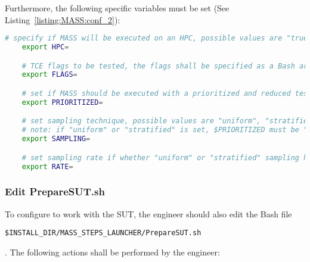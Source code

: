 Furthermore, the following specific \MASS variables must be set (See Listing~\ref{listing:MASS:conf_2}):

\begin{lstlisting}[language=bash, label=listing:MASS:conf_2, caption=\MASS specific variables. Excerpt of mass\_conf.sh file.]
	# specify if MASS will be executed on an HPC, possible values are "true" or "false"
	export HPC=

	# TCE flags to be tested, the flags shall be specified as a Bash array, e.g., ("-O0" "-O1").
	export FLAGS=

	# set if MASS should be executed with a prioritized and reduced test suite, possible values are "true" or "false"
	export PRIORITIZED=

	# set sampling technique, possible values are "uniform", "stratified", "fsci", and "no"
	# note: if "uniform" or "stratified" is set, $PRIORITIZED must be "false"
	export SAMPLING=

	# set sampling rate if whether "uniform" or "stratified" sampling has been selected
	export RATE=
\end{lstlisting}

\subsubsection{Edit PrepareSUT.sh}


To configure \MASS to work with the SUT, the engineer should also edit the Bash file \\\begin{small}\texttt{\$INSTALL\_DIR/MASS\_STEPS\_LAUNCHER/PrepareSUT.sh}\end{small}. The following actions shall be performed by the engineer:

